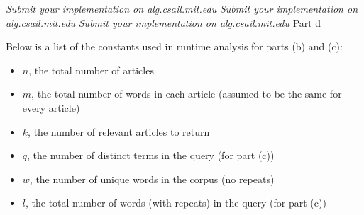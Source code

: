 \documentclass[12pt,twoside]{article}
\begin{document}
\begin{problems}
\problem
\begin{problemparts}
\problempart \emph{Submit your implementation on alg.csail.mit.edu}
\problempart \emph{Submit your implementation on alg.csail.mit.edu}
\problempart \emph{Submit your implementation on alg.csail.mit.edu}
\problempart Part d %

Below is a list of the constants used in runtime analysis for parts (b) and (c):
\begin{itemize}
	\item $n$, the total number of articles
	\item $m$, the total number of words in each article (assumed to be the same for every article)
	\item $k$, the number of relevant articles to return
	\item $q$, the number of distinct terms in the query (for part (c))
	\item $w$, the number of unique words in the corpus (no repeats)
	\item $l$, the total number of words (with repeats) in the query (for part (c))
\end{itemize}


\newcommand{\functionb}{get-relevant-articles-tf-idf}
\newcommand{\functionc}{search}

\vspace{5mm}


\end{problemparts}
\end{problems}
\end{document}
